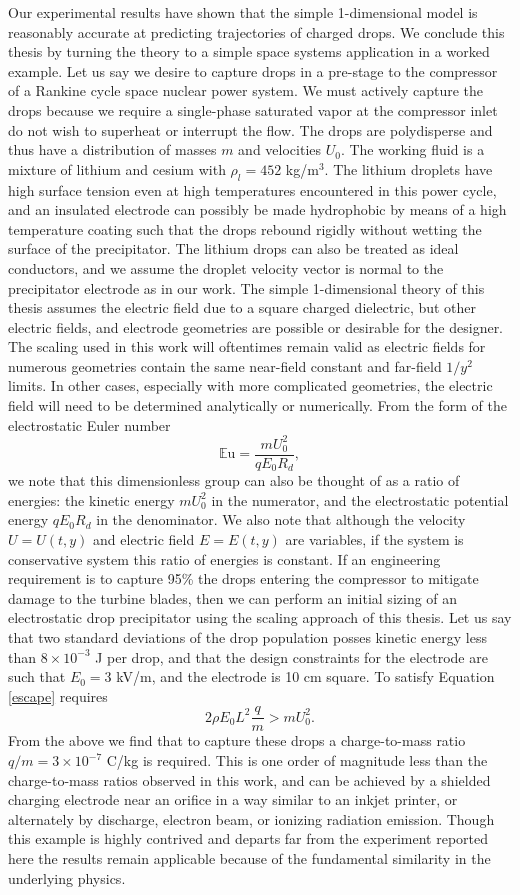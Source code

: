 \documentclass[12pt,a4paper,oneside]{book}
\begin{document}
Our experimental results have shown that the simple 1-dimensional model is reasonably accurate at predicting trajectories of charged drops.   We conclude this thesis by turning the theory to a simple space systems application in a worked example. Let us say we desire to capture drops in a pre-stage to the compressor of a Rankine cycle space nuclear power system. We must actively capture the drops because we require a single-phase saturated vapor at the compressor inlet do not wish to superheat or interrupt the flow. The drops are polydisperse and thus have a distribution of masses $m$ and velocities $U_0$. The working fluid is a mixture of lithium and cesium with $\rho_l = 452$ kg/m$^3$. The lithium droplets have high surface tension even at high temperatures encountered in this power cycle, and an insulated electrode can possibly be made hydrophobic by means of a high temperature coating such that the drops rebound rigidly without wetting the surface of the precipitator. The lithium drops can also be treated as ideal conductors, and we assume the droplet velocity vector is normal to the precipitator electrode as in our work. The simple 1-dimensional theory of this thesis assumes the electric field due to a square charged dielectric, but other electric fields, and electrode geometries are possible or desirable for the designer. The scaling used in this work will oftentimes remain valid as electric fields for numerous geometries contain the same near-field constant and far-field $1/y^2$ limits. In other cases, especially with more complicated geometries, the electric field will need to be determined analytically or numerically. From the form of the electrostatic Euler number
\[
\mathbb{E}\mbox{u} = \frac{m U_0^2}{q E_0 R_d},
\]
we note that this dimensionless group can also be thought of as a ratio of energies: the kinetic energy $m U_0^2$ in the numerator, and the electrostatic potential energy $q E_0 R_d$ in the denominator. We also note that although the velocity $U = U(t,y)$ and electric field $E = E(t,y)$ are variables, if the system is conservative system this ratio of energies is constant. If an engineering requirement is to capture 95\% the drops entering the compressor to mitigate damage to the turbine blades, then we can perform an initial sizing of an electrostatic drop precipitator using the scaling approach of this thesis. Let us say that two standard deviations of the drop population posses kinetic energy less than $8 \times 10^{-3}$ J per drop, and that the design constraints for the electrode are such that $E_0=3$ kV/m, and the electrode is 10 cm square. To satisfy Equation \ref{escape} requires
\[
2\rho E_0 L^2 \frac{q}{m} > mU_0^2.
\] 
From the above we find that to capture these drops a charge-to-mass ratio $q/m=3 \times 10^{-7}$ C/kg is required. This is one order of magnitude less than the charge-to-mass ratios observed in this work, and can be achieved by a shielded charging electrode near an orifice in a way similar to an inkjet printer, or alternately by discharge, electron beam, or ionizing radiation emission. Though this example is highly contrived and departs far from the experiment reported here the results remain applicable because of the fundamental similarity in the underlying physics.
\end{document}
